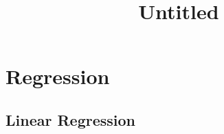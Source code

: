 \documentclass[11pt]{article}
\title{Untitled}
\begin{document}
    
    
    \maketitle
    
    

    
    \hypertarget{regression}{%
\section{Regression}\label{regression}}

\hypertarget{linear-regression}{%
\subsection{Linear Regression}\label{linear-regression}}
\end{document}
